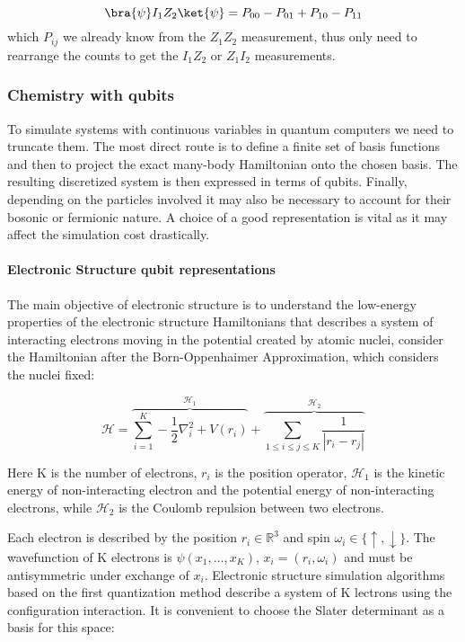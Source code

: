 \begin{equation*}
    \bra{\psi} I_1 Z_2 \ket{\psi} = P_{00} - P_{01} + P_{10} - P_{11}
\end{equation*}
which $P_{ij}$ we already know from the $Z_1 Z_2$ measurement, thus only need to rearrange the counts to get the $I_1 Z_2$ or $Z_1 I_2$ measurements.

\subsubsection{Chemistry with qubits}
\label{Subsubsec: Chemistry with qubits}

To simulate systems with continuous variables in quantum computers we need to truncate them. The most direct route is to define a finite set of basis functions and then to project the exact many-body Hamiltonian onto the chosen basis. The resulting discretized system is then expressed in terms of qubits. Finally, depending on the particles involved it may also be necessary to account for their bosonic or fermionic nature. A choice of a good representation is vital as it may affect the simulation cost drastically.

\paragraph{Electronic Structure qubit representations}

The main objective of electronic structure is to understand the low-energy properties of the electronic structure Hamiltonians that describes a system of interacting electrons moving in the potential created by atomic nuclei, consider the Hamiltonian after the Born-Oppenhaimer Approximation, which considers the nuclei fixed:

\begin{equation}
    \label{Eq: Eletronic Hamiltonian}
    \mathcal{H} = \overbrace{\sum_{i=1}^K - \frac{1}{2} \nabla_i^2 + V(r_i)}^{\mathcal{H}_1} + \overbrace{\sum_{1 \leq i \leq j \leq K} \frac{1}{|r_i - r_j|}}^{\mathcal{H}_2} 
\end{equation}

Here K is the number of electrons, $r_i$ is the position operator, $\mathcal{H}_1$ is the kinetic energy of non-interacting electron and the potential energy of non-interacting electrons, while $\mathcal{H}_2$ is the Coulomb repulsion between two electrons.

Each electron is described by the position $r_i \in \mathbb{R}^3$ and spin $\omega_i \in \{ \uparrow, \downarrow \}$. The wavefunction of K electrons is $\psi( x_1, \dots, x_K)$, $x_i = (r_i, \omega_i)$ and must be antisymmetric under exchange of $x_i$. Electronic structure simulation algorithms based on the first quantization method describe a system of K lectrons using the configuration interaction. It is convenient to choose the Slater determinant as a basis for this space:


